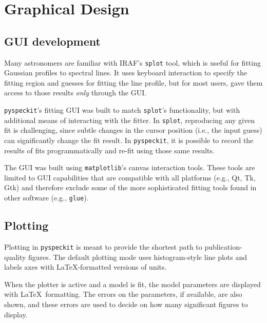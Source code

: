 \documentclass[twocolumn]{aastex62}
\newcommand{\pyspeckit}{\texttt{pyspeckit}\xspace}
\newcommand{\astropy}{\texttt{astropy}\xspace}
\begin{document}
\section{Graphical Design}
\label{sec:gui}
\subsection{GUI development}
Many astronomers are familiar with IRAF's \texttt{splot} tool, which is useful
for fitting Gaussian profiles to spectral lines.  It uses keyboard interaction
to specify the fitting region and guesses for fitting the line profile, but for
most users, gave them access to those results \emph{only} through the GUI.

\texttt{pyspeckit}'s fitting GUI was built to match \texttt{splot}'s
functionality, but with additional means of interacting with the fitter.  In
\texttt{splot}, reproducing any given fit is challenging, since subtle changes
in the cursor position (i.e., the input guess) can significantly change the fit
result.  In \pyspeckit, it is possible to record the results of fits
programmatically and re-fit using those same results.

The GUI was built using \texttt{matplotlib}'s canvas interaction tools.  These
tools are limited to GUI capabilities that are compatible with all platforms
(e.g., Qt, Tk, Gtk) and therefore exclude some of the more sophisticated fitting
tools found in other software (e.g., \texttt{glue}). 

\subsection{Plotting}
Plotting in \pyspeckit is meant to provide the shortest path to
publication-quality figures.  The default plotting mode uses histogram-style
line plots and 
labels axes with \LaTeX-formatted versions of units.

When the plotter is active and a model is fit, the model parameters are
displayed with \LaTeX~formatting.  The errors on the parameters, if available,
are also shown, and these errors are used to decide on how many significant
figures to display.

\end{document}
